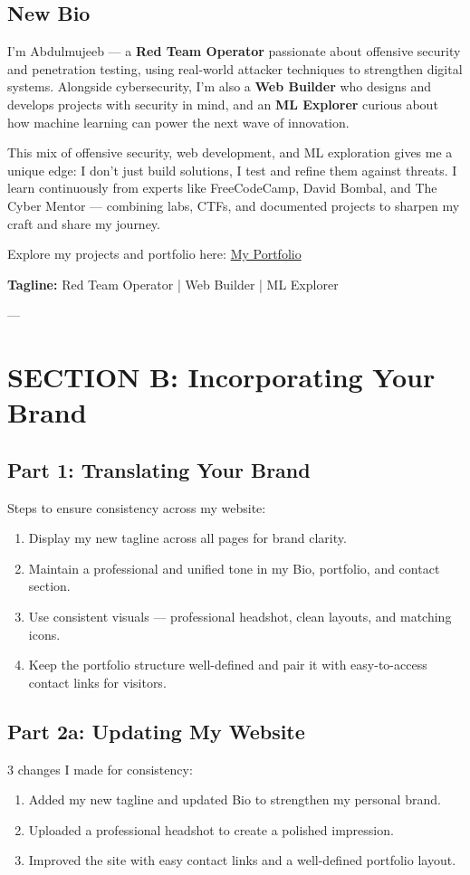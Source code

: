 \documentclass[12pt,a4paper]{article}
\begin{document}
\subsection*{New Bio}
I’m Abdulmujeeb — a \textbf{Red Team Operator} passionate about offensive security and penetration testing, using real-world attacker techniques to strengthen digital systems. Alongside cybersecurity, I’m also a \textbf{Web Builder} who designs and develops projects with security in mind, and an \textbf{ML Explorer} curious about how machine learning can power the next wave of innovation.  

This mix of offensive security, web development, and ML exploration gives me a unique edge: I don’t just build solutions, I test and refine them against threats. I learn continuously from experts like FreeCodeCamp, David Bombal, and The Cyber Mentor — combining labs, CTFs, and documented projects to sharpen my craft and share my journey.  

Explore my projects and portfolio here:  
\href{https://sites.google.com/view/abdulmujeeb-uthman}{My Portfolio}  

\textbf{Tagline:} Red Team Operator | Web Builder | ML Explorer  

---

\section*{SECTION B: Incorporating Your Brand}

\subsection*{Part 1: Translating Your Brand}
Steps to ensure consistency across my website:
\begin{enumerate}
    \item Display my new tagline across all pages for brand clarity.
    \item Maintain a professional and unified tone in my Bio, portfolio, and contact section.
    \item Use consistent visuals — professional headshot, clean layouts, and matching icons.
    \item Keep the portfolio structure well-defined and pair it with easy-to-access contact links for visitors.
\end{enumerate}

\subsection*{Part 2a: Updating My Website}
3 changes I made for consistency:
\begin{enumerate}
    \item Added my new tagline and updated Bio to strengthen my personal brand.
    \item Uploaded a professional headshot to create a polished impression.
    \item Improved the site with easy contact links and a well-defined portfolio layout.
\end{enumerate}
\end{document}
